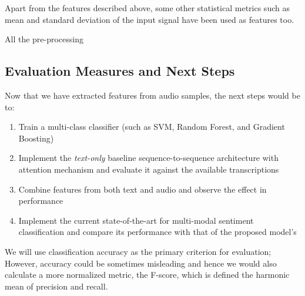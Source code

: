 \documentclass[11pt,a4paper]{article}
\begin{document}
Apart from the features described above, some other statistical metrics such as mean and standard deviation of the input signal have been used as features too.

All the pre-processing

\subsection*{Evaluation Measures and Next Steps}


Now that we have extracted features from audio samples, the next steps would be to:

\begin{enumerate}
\item Train a multi-class classifier (such as SVM, Random Forest, and Gradient Boosting)
\item Implement the \textit{text-only} baseline sequence-to-sequence architecture \cite{sutskever2014sequence} with attention mechanism \cite{bahdanau2014neural} and evaluate it against the available transcriptions
\item Combine features from both text and audio and observe the effect in performance
\item Implement the current state-of-the-art for multi-modal sentiment classification \cite{liu2018efficient} and compare its performance with that of the proposed model's
\end{enumerate}

We will use classification accuracy as the primary criterion for evaluation; However, accuracy could be sometimes misleading and hence we would also calculate a more normalized metric, the F-score, which is defined the harmonic mean of precision and recall.
\end{document}
